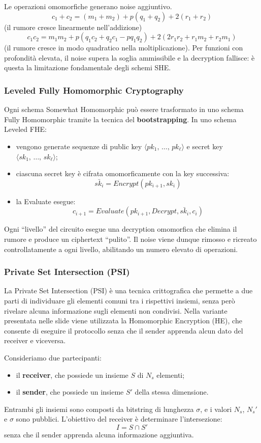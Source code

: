 Le operazioni omomorfiche generano noise aggiuntivo.
\[
c_1 + c_2 = (m_1 + m_2) + p(q_1 + q_2) + 2(r_1 + r_2)
\]
(il rumore cresce linearmente nell’addizione)
\[
c_1 c_2 = m_1 m_2 + p(q_1 c_2 + q_2 c_1 - pq_1 q_2) + 2(2 r_1 r_2 + r_1 m_2 + r_2 m_1)
\]
(il rumore cresce in modo quadratico nella moltiplicazione).
Per funzioni con profondità elevata, il noise supera la soglia ammissibile e la decryption fallisce: è questa la limitazione fondamentale degli schemi SHE.

\subsubsection{Leveled Fully Homomorphic Cryptography}

Ogni schema Somewhat Homomorphic può essere trasformato in uno schema Fully Homomorphic tramite la tecnica del \textbf{bootstrapping}.
In uno schema Leveled FHE:
\begin{itemize}
    \item vengono generate sequenze di public key $\langle pk_1,\, \dots,\, pk_\ell \rangle$ e secret key $\langle sk_1,\, \dots,\, sk_\ell \rangle$;
    \item ciascuna secret key è cifrata omomorficamente con la key successiva:
    \[
    \bar{sk_i} = Encrypt(pk_{i+1}, sk_i)
    \]
    \item la Evaluate esegue:
    \[
    c_{i+1} = Evaluate(pk_{i+1}, Decrypt, \bar{sk_i}, c_i)
    \]
\end{itemize}
Ogni “livello” del circuito esegue una decryption omomorfica che elimina il rumore e produce un ciphertext “pulito”.
Il noise viene dunque rimosso e ricreato controllatamente a ogni livello, abilitando un numero elevato di operazioni.

\subsubsection{Private Set Intersection (PSI)}

La Private Set Intersection (PSI) è una tecnica crittografica che permette a due parti di individuare gli elementi comuni tra i rispettivi insiemi, senza però rivelare alcuna informazione sugli elementi non condivisi.
Nella variante presentata nelle slide viene utilizzata la Homomorphic Encryption (HE), che consente di eseguire il protocollo senza che il sender apprenda alcun dato del receiver e viceversa.

Consideriamo due partecipanti:
\begin{itemize}
    \item il \textbf{receiver}, che possiede un insieme $S$ di $N_s$ elementi;
    \item il \textbf{sender}, che possiede un insieme $S'$ della stessa dimensione.
\end{itemize}
Entrambi gli insiemi sono composti da bitstring di lunghezza $\sigma$, e i valori $N_s$, $N_s'$ e $\sigma$ sono pubblici.
L’obiettivo del receiver è determinare l’intersezione:
\[
I = S \cap S'
\]
senza che il sender apprenda alcuna informazione aggiuntiva.


